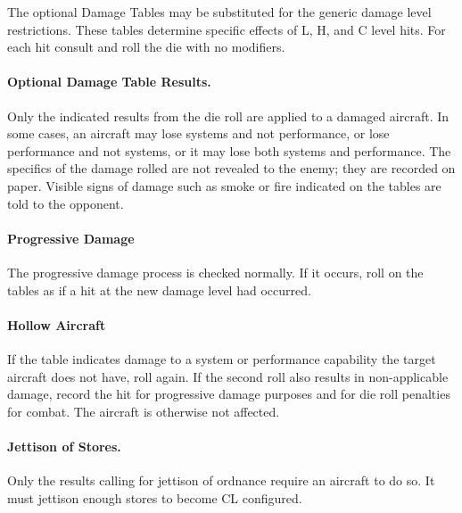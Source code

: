 \begin{advancedrules}

The optional Damage Tables may be substituted for the generic damage level restrictions. These tables determine specific effects of L, H, and C level hits. For each hit consult  and roll the die with no modifiers.  

\paragraph{Optional Damage Table Results.} Only the indicated results from the die roll are applied to a damaged aircraft. In some cases, an aircraft may lose systems and not performance, or lose performance and not systems, or it may lose both systems and performance. The specifics of the damage rolled are not revealed to the enemy; they are recorded on paper. Visible signs of damage such as smoke or fire indicated on the tables are told to the opponent.

\paragraph{Progressive Damage} The progressive damage process is checked normally. If it occurs, roll on the tables as if a hit at the new damage level had occurred.

\paragraph{Hollow Aircraft} If the table indicates damage to a system or performance capability the target aircraft does not have, roll again. If the second roll also results in non-applicable damage, record the hit for progressive damage purposes and for die roll penalties for combat. The aircraft is otherwise not affected.

\paragraph{Jettison of Stores.} Only the results calling for jettison of ordnance require an aircraft to do so. It must jettison enough stores to become CL configured.


\end{advancedrules}
